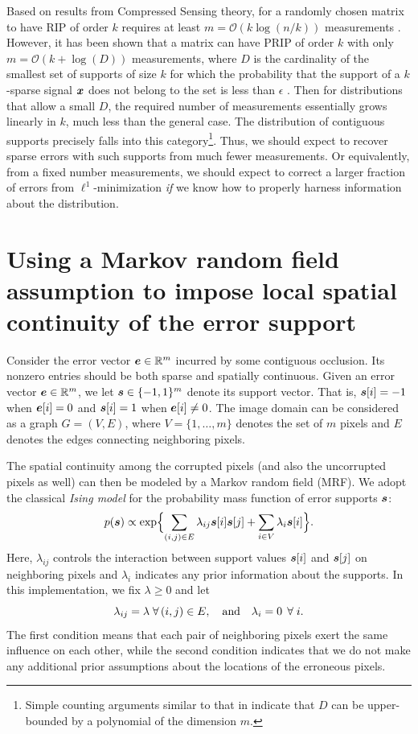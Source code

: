 Based on results from Compressed Sensing theory, for a randomly chosen matrix to have RIP of order $k$ requires at least $m =\mathcal{O}(k\log(n/k))$ measurements \cite{CandesE2005-IT}. However, it has been shown that a matrix can have PRIP of order $k$ with only $m =\mathcal {O}(k + \log(D))$ measurements, where $D$ is the cardinality of the smallest set of supports of size $k$ for which the probability that the support of a $k$-sparse signal ${\boldsymbol{x}}$ does not belong to the set is less than $\epsilon$ \cite{Cevher2008-NIPS}. Then for distributions that allow a small $D$, the required number of measurements essentially grows linearly in $k$, much less than the general case. The distribution of contiguous supports precisely falls into this category\footnote{Simple counting arguments similar to that in \cite{Cevher2008-NIPS} indicate that $D$ can be upper-bounded by a polynomial of the dimension $m$.}. Thus, we should expect to recover sparse errors with such supports from much fewer measurements. Or equivalently, from a fixed number measurements, we should expect to correct a larger fraction of errors from $\ell^1$-minimization {\em if} we know how to properly harness information about the distribution.

\section{Using a Markov random field assumption to impose local spatial continuity of the error support}
Consider the error vector $\boldsymbol{e}\in \mathbb R^m$ incurred by some contiguous occlusion. Its nonzero entries should be both sparse and spatially continuous. Given an error vector $\boldsymbol{e}\in \mathbb R^m$, we let $\boldsymbol{s}\in \{-1,1\}^m$ denote its
support vector. That is, $\boldsymbol{s}[i] = -1$ when $\boldsymbol{e}[i] = 0$ and $\boldsymbol{s}[i] = 1$
when $\boldsymbol{e}[i] \neq 0$. The image domain can be considered as a graph
$G=(V,E)$, where $V = \{1,\dots,m\}$ denotes the set of $m$
pixels and $E$ denotes the edges connecting neighboring pixels.

The spatial continuity among the corrupted pixels (and also the uncorrupted pixels as well) can then be modeled by a Markov random field (MRF). We adopt the classical {\em Ising model} for the probability mass function of error supports $\boldsymbol{s}$:
\begin{equation}
p(\boldsymbol{s}) \propto \exp\Bigl\{\sum_{(i,j)\in
E}\lambda_{ij}\boldsymbol{s}[i]\boldsymbol{s}[j] + \sum_{i\in V}\lambda_i \boldsymbol{s}[i]\Bigr\}.
\label{eqn:ising}
\end{equation}
Here, $\lambda_{ij}$ controls the interaction between support values $\boldsymbol{s}[i]$ and $\boldsymbol{s}[j]$ on neighboring pixels and $\lambda_i$ indicates any prior information about the supports. In this implementation, we fix $\lambda \ge 0$ and let \vspace{0mm}
\begin{displaymath}
{\lambda}_{ij} = \lambda \;\forall\,(i,j) \in E, \quad \mbox{and} \quad \lambda_i = 0 \;\,\forall\;i. \vspace{0mm}
\end{displaymath}
The first condition means that each pair of neighboring pixels exert the same influence on each other, while the second condition indicates that we do not make any additional prior assumptions about the locations of the erroneous pixels.

